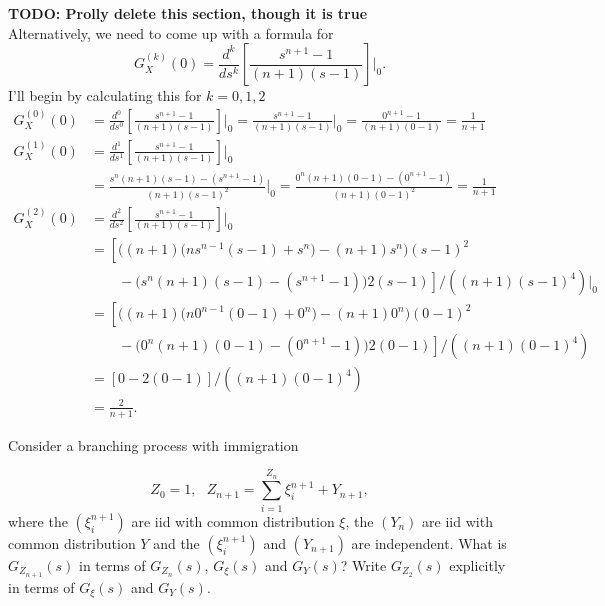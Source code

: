 \documentclass[10pt]{amsart}
\begin{document}
\noindent
\textbf{ TODO: Prolly delete this section, though it is true} \\
Alternatively, we need to come up with a formula for
$$G_X^{(k)}(0) =  \frac {d^k} {ds^k} \left[ \frac {s^{n + 1} - 1}{(n + 1)(s - 1)} \right] \Bigg|_0. $$
I'll begin by calculating this for $k = 0, 1, 2$
\begin{align*}
G_X^{(0)}(0) &=  \frac {d^0} {ds^0} \left[ \frac {s^{n + 1} - 1}{(n + 1)(s - 1)} \right] \Bigg|_0
	= \frac {s^{n + 1} - 1}{(n + 1)(s - 1)} \Bigg|_0
	= \frac {0^{n + 1} - 1}{(n + 1)(0 - 1)}
	= \frac 1 {n + 1} \\
G_X^{(1)}(0) &=  \frac {d^1} {ds^1} \left[ \frac {s^{n + 1} - 1}{(n + 1)(s - 1)} \right] \Bigg|_0 \\
	&= \frac {s^{n}(n + 1)(s - 1) - (s^{n + 1} - 1)}{(n + 1)(s - 1)^2} \Bigg|_0 
	= \frac {0^{n}(n + 1)(0 - 1) - (0^{n + 1} - 1)}{(n + 1)(0 - 1)^2}
	= \frac 1 {n + 1} \\
G_X^{(2)}(0) &=  \frac {d^2} {ds^2} \left[ \frac {s^{n + 1} - 1}{(n + 1)(s - 1)} \right] \Bigg|_0 \\
	&= \left[ \bigg((n + 1) \big(n s^{n- 1}(s - 1) + s^{n}\big) - (n + 1)s^n\bigg)(s - 1)^2 \right. \\
	& \left. \quad\quad - \bigg(s^{n}(n + 1)(s - 1) - (s^{n + 1} - 1)\bigg)2(s - 1) \right] \bigg/ \left( (n + 1)(s - 1)^4 \right) \Bigg|_0 \\
	&= \left[ \bigg((n + 1) \big(n 0^{n- 1}(0 - 1) + 0^{n}\big) - (n + 1)0^n\bigg)(0 - 1)^2 \right. \\
	& \left. \quad\quad - \bigg(0^{n}(n + 1)(0 - 1) - (0^{n + 1} - 1)\bigg)2(0 - 1) \right] \bigg/ \left( (n + 1)(0 - 1)^4 \right) \\
	&= \left[ 0 - 2(0 - 1) \right] / \left( (n + 1)(0 - 1)^4 \right) \\
	&= \frac {2}{n + 1}.
\end{align*}

\newpage

 Consider a branching process with immigration

$$Z_0 = 1, \,\,\,\,Z_{n+1} = \sum_{i=1}^{Z_n}  \xi^{n+1}_i + Y_{n+1},$$
where the $(\xi^{n+1}_i)$ are iid with common distribution $\xi$, the $(Y_n)$ are iid with common distribution $Y$ and
the $(\xi^{n+1}_i)$ and $(Y_{n+1})$ are independent. What is $G_{Z_{n+1}}(s)$ in terms of $G_{Z_n}(s)$, $G_{\xi}(s)$ and $G_Y(s)$? Write $G_{Z_2}(s)$ explicitly in terms of $G_\xi(s)$ and $G_Y(s)$. \\
\end{document}
